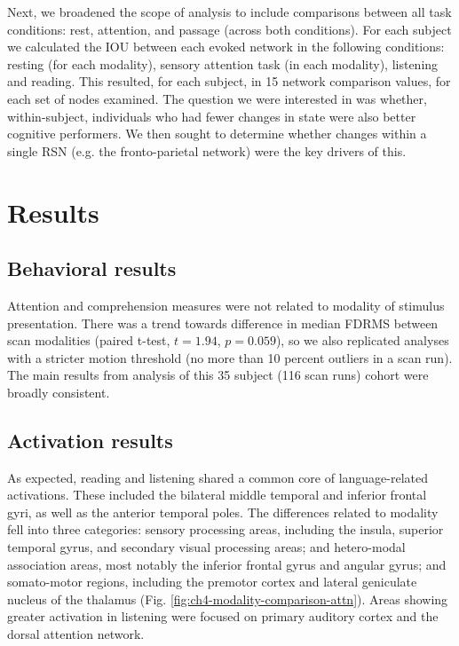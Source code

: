 Next, we broadened the scope of analysis to include comparisons between all task conditions: rest, attention, and passage (across both conditions). For each subject we calculated the IOU between each evoked network in the following conditions: resting (for each modality), sensory attention task (in each modality), listening and reading. This resulted, for each subject, in 15 network comparison values, for each set of nodes examined. The question we were interested in was whether, within-subject, individuals who had fewer changes in state were also better cognitive performers. We then sought to determine whether changes within a single RSN (e.g. the fronto-parietal network) were the key drivers of this. 

\section{Results}

\subsection{Behavioral results}

Attention and comprehension measures were not related to modality of stimulus presentation. There was a trend towards difference in median FDRMS between scan modalities (paired t-test, $t = 1.94$, $p = 0.059$), so we also replicated analyses with a stricter motion threshold (no more than 10 percent outliers in a scan run). The main results from analysis of this 35 subject (116 scan runs) cohort were broadly consistent.

\subsection{Activation results}

As expected, reading and listening shared a common core of language-related activations. These included the bilateral middle temporal and inferior frontal gyri, as well as the  anterior temporal poles. The differences related to modality fell into three categories: sensory processing areas, including the insula, superior temporal gyrus, and secondary visual processing areas; and hetero-modal association areas, most notably the inferior frontal gyrus and angular gyrus; and somato-motor regions, including the premotor cortex and lateral geniculate nucleus of the thalamus (Fig. \ref{fig:ch4-modality-comparison-attn}). Areas showing greater activation in listening were focused on primary auditory cortex and the dorsal attention network.

